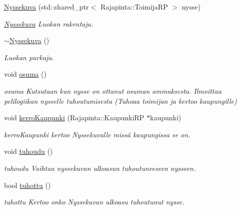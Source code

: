 \begin{DoxyCompactItemize}
\item 
\hyperlink{class_nyssekuva_a15c81255af4f21daabdc79eb7369c274}{Nyssekuva} (std\-::shared\-\_\-ptr$<$ Rajapinta\-::\-Toimija\-R\-P $>$ nysse)
\begin{DoxyCompactList}\small\item\em \hyperlink{class_nyssekuva}{Nyssekuva} Luokan rakentaja. \end{DoxyCompactList}\item 
\hyperlink{class_nyssekuva_a042ecc1e24eec8b66458c638fd6b68b1}{$\sim$\-Nyssekuva} ()
\begin{DoxyCompactList}\small\item\em Luokan purkaja. \end{DoxyCompactList}\item 
void \hyperlink{class_nyssekuva_aab047a42f0f69bf37daded779a1a1dee}{osuma} ()
\begin{DoxyCompactList}\small\item\em osuma Kutsutaan kun nysse on ottanut osuman ammuksesta. Ilmoittaa pelilogiikan nysselle tuhoutumisesta (Tuhoaa toimijan ja kertoo kaupungille) \end{DoxyCompactList}\item 
void \hyperlink{class_nyssekuva_a02b8f283b6ccacd0afe435d9eccd728b}{kerro\-Kaupunki} (Rajapinta\-::\-Kaupunki\-R\-P $\ast$kaupunki)
\begin{DoxyCompactList}\small\item\em kerro\-Kaupunki kertoo Nyssekuvalle missä kaupungissa se on. \end{DoxyCompactList}\item 
void \hyperlink{class_nyssekuva_a4d88edacd7a24757ad89253fe95caa5e}{tuhoudu} ()
\begin{DoxyCompactList}\small\item\em tuhoudu Vaihtaa nyssekuvan ulkoasun tuhoutuneeseen nysseen. \end{DoxyCompactList}\item 
bool \hyperlink{class_nyssekuva_acfa9ae5331b43f8bfec01d8c0c57c221}{tuhottu} ()
\begin{DoxyCompactList}\small\item\em tuhottu Kertoo onko Nyssekuvan ulkoasu tuhoutunut nysse. \end{DoxyCompactList}\end{DoxyCompactItemize}
